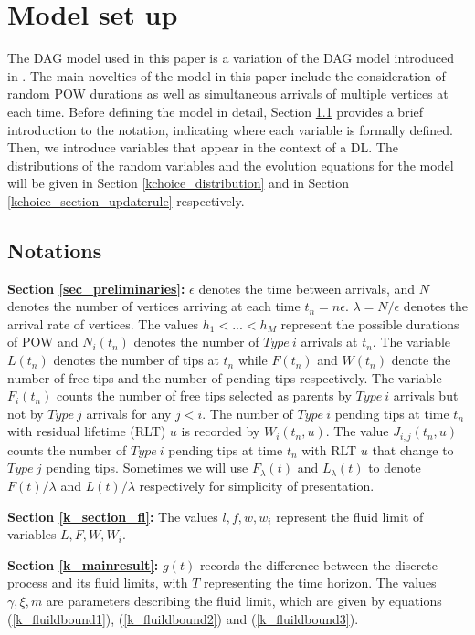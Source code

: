 \documentclass[12pt]{article}
\numberwithin{equation}{section}  %
\begin{document}
\section{Model set up}\label{kchoice_preliminary}
The DAG model used in this paper is a variation of the DAG model introduced in \cite{Ck21}. The main novelties of the model in this paper include the consideration of random POW durations as well as simultaneous arrivals of multiple vertices at each time. Before defining the model in detail, Section \ref{sec_notation} provides a brief introduction to the notation, indicating where each variable is formally defined. Then, we introduce variables that appear in the context of a DL. The distributions of the random variables and the evolution equations for the model will be given in Section \ref{kchoice_distribution} and in Section \ref{kchoice_section_updaterule} respectively.

\subsection{Notations}\label{sec_notation}
\textbf{Section \ref{sec_preliminaries}:} $\epsilon$ denotes the time between arrivals, and $N$ denotes the number of vertices arriving at each time $t_n=n\epsilon$. $\lambda=N/\epsilon$ denotes the arrival rate of vertices. The values $h_1<...<h_M$ represent the possible durations of POW and $N_i(t_n)$ denotes the number of $Type\ i$ arrivals at $t_n$. The variable $L(t_n)$ denotes the number of tips at $t_n$ while $F(t_n)$ and $W(t_n)$ denote the number of free tips and the number of pending tips respectively. The variable $F_i(t_n)$ counts the number of free tips selected as parents by $Type\ i$ arrivals but not by $Type\ j$ arrivals for any $j<i$. The number of $Type\ i$ pending tips at time $t_n$ with residual lifetime (RLT) $u$ is recorded by $W_i(t_n,u)$. The value $J_{i,j}(t_n,u)$ counts the number of $Type\ i$ pending tips at time $t_n$ with RLT $u$ that change to $Type\ j$ pending tips. Sometimes we will use $F_\lambda(t)$ and $L_\lambda(t)$ to denote $F(t)/\lambda$ and $L(t)/\lambda$ respectively for simplicity of presentation.

\textbf{Section \ref{k_section_fl}:} The values $l,f,w,w_i$ represent the fluid limit of variables $L,F,W,W_i$.

\textbf{Section \ref{k_mainresult}:} $g(t)$ records the difference between the discrete process and its fluid limits, with $T$ representing the time horizon. The values $\gamma,\xi,m$ are parameters describing the fluid limit, which are given by equations (\ref{k_fluildbound1}), (\ref{k_fluildbound2}) and (\ref{k_fluildbound3}).
\end{document}
